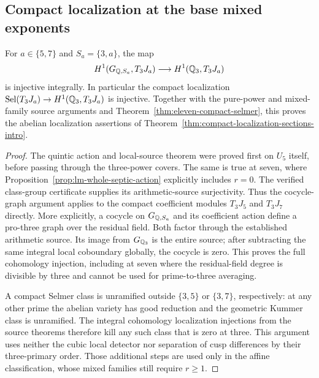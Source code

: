 \subsection{Compact localization at the base mixed exponents}
\label{subsec:compact-base-cases}
\begin{corollary}
\label{cor:compact-base-source-five-seven}
For $a\in\{5,7\}$ and $S_a=\{3,a\}$, the map
\[
 H^1(G_{\mathbb Q,S_a},T_3J_a)\longrightarrow H^1(\mathbb Q_3,T_3J_a)
\]
is injective integrally. In particular the compact localization
$\operatorname{Sel}(T_3J_a)\to H^1(\mathbb Q_3,T_3J_a)$ is injective.
Together with the pure-power and mixed-family source
arguments and Theorem~\ref{thm:eleven-compact-selmer}, this proves the abelian localization assertions of
Theorem~\ref{thm:compact-localization-sections-intro}.
\end{corollary}
\begin{proof}
The quintic action and local-source theorem were proved first on
$U_5$ itself, before passing through the three-power covers. The
same is true at seven, where Proposition~\ref{prop:lm-whole-septic-action}
explicitly includes $r=0$. The verified class-group certificate
supplies its arithmetic-source surjectivity. Thus the cocycle-graph
argument applies to the compact coefficient modules $T_3J_5$ and
$T_3J_7$ directly. More explicitly, a cocycle on $G_{\mathbb Q,S_a}$
and its coefficient action define a pro-three graph over the
residual field. Both factor through the established arithmetic
source. Its image from $G_{\mathbb Q_3}$ is the entire source; after
subtracting the same integral local coboundary globally, the
cocycle is zero. This proves the full cohomology injection,
including at seven where the residual-field degree is divisible
by three and cannot be used for prime-to-three averaging.

A compact Selmer class is unramified outside $\{3,5\}$ or
$\{3,7\}$, respectively: at any other prime the abelian variety
has good reduction and the geometric Kummer class is unramified.
The integral cohomology localization injections from the source
theorems therefore kill any such class that is zero at three.
This argument uses neither the cubic local detector nor separation
of cusp differences by their three-primary order. Those additional
steps are used only in the affine classification, whose mixed
families still require $r\ge1$.
\end{proof}
